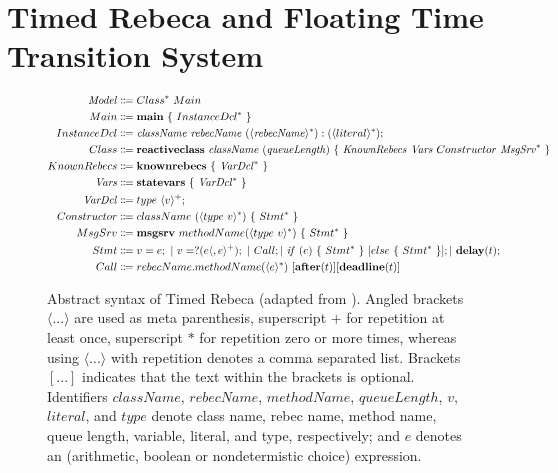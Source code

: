 \section{Timed Rebeca and Floating Time Transition System} \label{sec::FTTS}

\begin{figure}[!htbp]
 	\begin{center}
 		\small
 		\begin{mdframed}
 			\begin{align*}
 		\mathit{Model} &\Coloneqq  Class^* ~ Main \qquad \\
 				Main &\Coloneqq \mathbf{main} ~ \{ ~ InstanceDcl^* ~ \} \qquad \\
 				InstanceDcl &\Coloneqq \mathit{className} ~ \mathit{rebecName}~(\langle \mathit{rebecName} \rangle ^*)  : (\langle literal \rangle ^*);\\
 				Class &\Coloneqq \mathbf{reactiveclass} ~ \mathit{className} ~ (\mathit{queueLength}) ~ \{ ~ \mathit{KnownRebecs} ~ \mathit{Vars} ~ Constructor ~ \mathit{MsgSrv}^* ~ \}\\
 				KnownRebecs &\Coloneqq \mathbf{knownrebecs} ~ \{ ~ \mathit{VarDcl}^* ~ \} ~ \\
 				\mathit{Vars} &\Coloneqq \mathbf{statevars} ~ \{ ~ \mathit{VarDcl}^* ~ \} ~ \\
 				\mathit{VarDcl} &\Coloneqq type ~ \langle v \rangle ^+;\\
 				Constructor &\Coloneqq className ~ (\langle type ~ v \rangle ^*) ~ \{ ~ Stmt^* ~ \} \\
 				MsgSrv &\Coloneqq \mathbf{msgsrv} ~ methodName(\langle type ~ v \rangle ^*) ~ \{ ~ Stmt^* ~ \} \\
 				Stmt &\Coloneqq v = e; ~| ~ v = ?(e\langle ,e \rangle^+); ~| ~ Call;| ~ {\it if} ~ (e) ~ \{ ~ Stmt^* ~ \} ~ [else ~ \{ ~ Stmt^* ~ \}]; |  ~ \mathbf{delay}(t); \\
 				Call &\Coloneqq rebecName.methodName(\langle e \rangle ^*) ~  [\mathbf{after}(t)]  [\mathbf{deadline}(t)]
 			\end{align*}
 		\end{mdframed}
 		\caption{Abstract syntax of Timed Rebeca (adapted from \cite{DBLP:journals/scp/KhamespanahSSKI15}). Angled brackets $\langle$...$\rangle$ are used as meta parenthesis, superscript $+$ for repetition at least once, superscript $*$ for repetition zero or more times, whereas using $\langle$...$\rangle$ with repetition denotes a comma separated list. Brackets $[...]$ indicates that the text within the brackets is optional. Identifiers $className$, $rebecName$, $methodName$, $queueLength$, $v$, $literal$, and $type$ denote class name, rebec name, method name, queue length, variable, literal, and type, respectively; and $e$ denotes an (arithmetic, boolean or nondetermistic choice) expression.
}
\end{center}
\end{figure}
